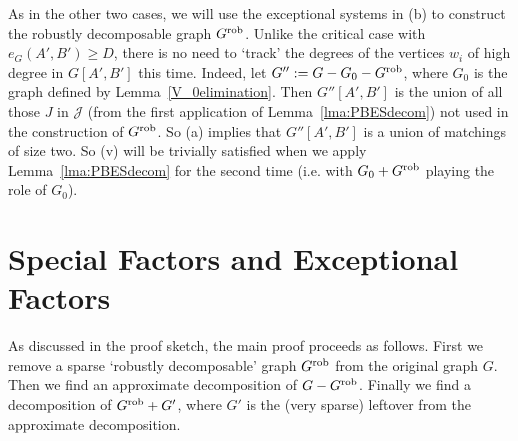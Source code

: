 \documentclass{memo-l}
\numberwithin{section}{chapter}
\numberwithin{equation}{section}
\numberwithin{firstthm}{section}
\numberwithin{figure}{section}
\begin{document}
As in the other two cases, we will use the exceptional systems in (b) to construct the robustly decomposable graph $G^{\rm rob}$.
Unlike the critical case with $e_G(A',B') \ge D$, there is no need to `track' the degrees of the vertices $w_i$ of high degree in $G[A',B']$
this time. Indeed, let $G'':=G - G_0 - G^{\rm rob}$, where $G_0$ is the graph defined by Lemma~\ref{V_0elimination}.
Then $G''[A',B']$ is the union of all those $J$ in $\mathcal J$ (from the first application of Lemma~\ref{lma:PBESdecom}) not used in the construction of $G^{\rm rob}$.
So (a) implies that $G''[A',B']$ is a union of matchings of size two. So (v) will be trivially satisfied when we apply 
Lemma~\ref{lma:PBESdecom} for the second time (i.e. with $G_0 +G^{\rm rob}$ playing the role of $G_0$).



\section{Special Factors and Exceptional Factors}\label{sec:SFandEF}

As discussed in the proof sketch, the main proof proceeds as follows.
First we remove a sparse `robustly decomposable' graph $G^{\rm rob}$ from the original graph $G$.
Then we find an approximate decomposition of $G-G^{\rm rob}$.
Finally we find a decomposition of $G^{\rm rob}+G'$, where $G'$ is  the (very sparse)
leftover from the approximate decomposition.
\end{document}
